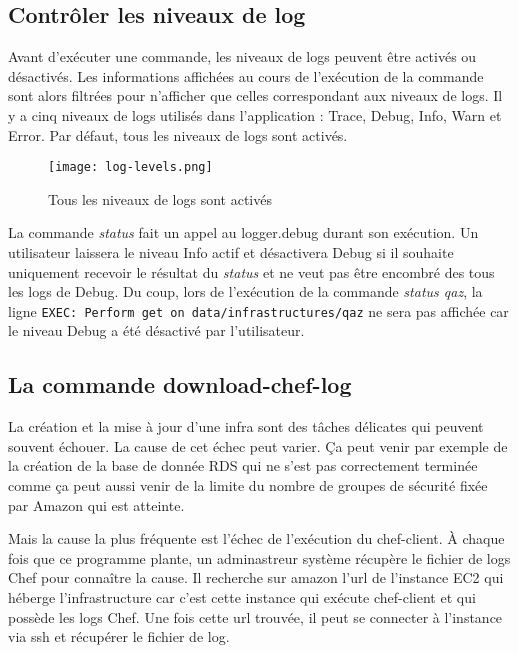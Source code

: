 \subsection{Contrôler les niveaux de log}

Avant d'exécuter une commande, les niveaux de logs peuvent être activés ou
désactivés. Les informations affichées au cours de l'exécution de la commande
sont alors filtrées pour n'afficher que celles correspondant aux niveaux de logs.
Il y a cinq niveaux de logs utilisés dans l'application : 
Trace, Debug, Info, Warn et Error.
Par défaut, tous les niveaux de logs sont activés.

\begin{figure}[H]
  \texttt{[image: log-levels.png]}
  \caption{Tous les niveaux de logs sont activés}
\end{figure}

\bigskip

La commande \textit{status} fait un appel au logger.debug durant son exécution.
Un utilisateur laissera le niveau Info actif et désactivera Debug
si il souhaite uniquement recevoir le résultat du \textit{status} et ne veut pas
être encombré des tous les logs de Debug.
Du coup, lors de l'exécution de la commande \textit{status qaz}, la ligne
\verb?EXEC: Perform get on data/infrastructures/qaz? ne sera pas affichée car le
niveau Debug a été désactivé par l'utilisateur.



\subsection{La commande download-chef-log}
La création et la mise à jour d'une infra sont des tâches délicates qui peuvent
souvent échouer.
La cause de cet échec peut varier.
Ça peut venir par exemple de la création de la base de donnée RDS qui ne s'est
pas correctement terminée comme ça peut aussi venir de la limite du nombre de
groupes de sécurité fixée par Amazon qui est atteinte.

Mais la cause la plus fréquente est l'échec de l'exécution du chef-client.
À chaque fois que ce programme plante, un adminastreur système récupère le
fichier de logs Chef pour connaître la cause. Il recherche sur amazon l'url de
l'instance EC2 qui héberge l'infrastructure car c'est cette instance qui exécute
chef-client et qui possède les logs Chef. Une fois cette url trouvée, il peut se
connecter à l'instance via ssh et récupérer le fichier de log.


